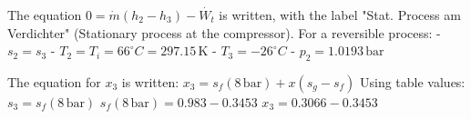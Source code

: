 The equation \( 0 = \dot{m}(h_2 - h_3) - \dot{W_t} \) is written, with the label "Stat. Process am Verdichter" (Stationary process at the compressor).  
For a reversible process:  
- \( s_2 = s_3 \)  
- \( T_2 = T_i = 66^\circ C = 297.15 \, \text{K} \)  
- \( T_3 = -26^\circ C \)  
- \( p_2 = 1.0193 \, \text{bar} \)  

The equation for \( x_3 \) is written:  
\( x_3 = s_f(8 \, \text{bar}) + x(s_g - s_f) \)  
Using table values:  
\( s_3 = s_f(8 \, \text{bar}) \)  
\( s_f(8 \, \text{bar}) = 0.983 - 0.3453 \)  
\( x_3 = 0.3066 - 0.3453 \)